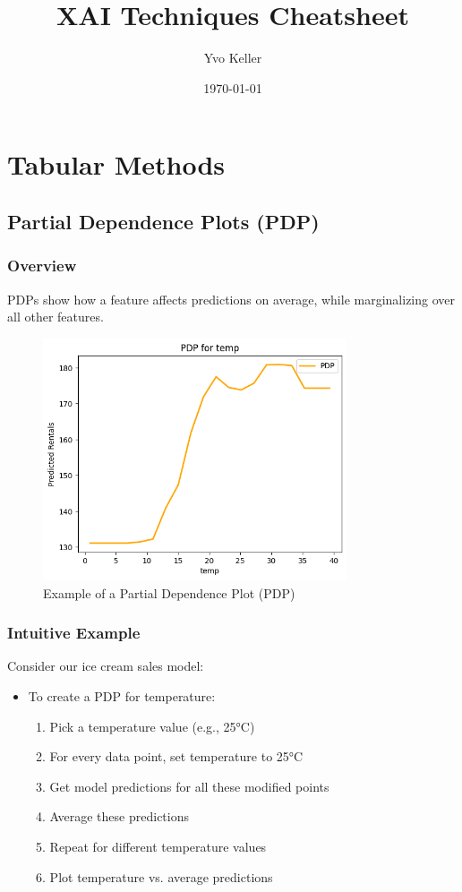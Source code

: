 \documentclass{article}
\title{XAI Techniques Cheatsheet}
\author{Yvo Keller}
\date{\today}
\begin{document}
\maketitle

\pagebreak
\section{Tabular Methods}

\subsection{Partial Dependence Plots (PDP)}

\subsubsection{Overview}
PDPs show how a feature affects predictions on average, while marginalizing over all other features.

\begin{figure}[h]
    \centering
    \includegraphics[width=0.8\textwidth]{images/pdp.png}
    \caption{Example of a Partial Dependence Plot (PDP)}
    \label{fig:pdp}
\end{figure}

\subsubsection{Intuitive Example}
Consider our ice cream sales model:
\begin{itemize}
    \item To create a PDP for temperature:
    \begin{enumerate}
        \item Pick a temperature value (e.g., 25°C)
        \item For every data point, set temperature to 25°C
        \item Get model predictions for all these modified points
        \item Average these predictions
        \item Repeat for different temperature values
        \item Plot temperature vs. average predictions
    \end{enumerate}
\end{itemize}
\end{document}
